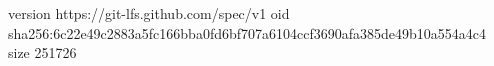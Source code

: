 version https://git-lfs.github.com/spec/v1
oid sha256:6c22e49c2883a5fc166bba0fd6bf707a6104ccf3690afa385de49b10a554a4c4
size 251726
